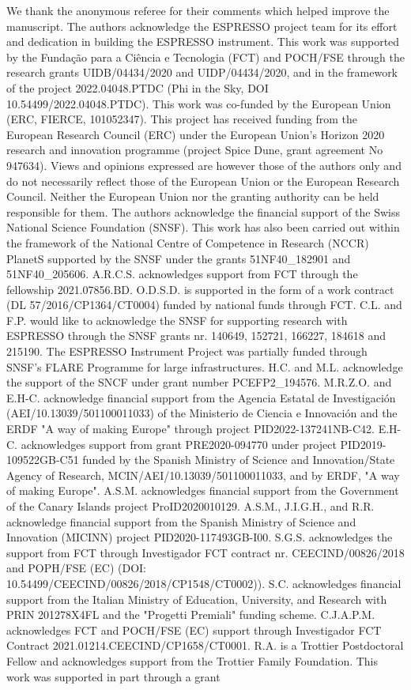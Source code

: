 \documentclass{aa}
\begin{document}
\begin{acknowledgements}
We thank the anonymous referee for their comments which helped improve the manuscript. The authors acknowledge the ESPRESSO project team for its effort and dedication in building the ESPRESSO instrument. This work was supported by the Funda\c{c}\~ao para a Ci\^encia e Tecnologia (FCT) and POCH/FSE through the research grants UIDB/04434/2020 and UIDP/04434/2020, and in the framework of the project 2022.04048.PTDC (Phi in the Sky, DOI 10.54499/2022.04048.PTDC). This work was co-funded by the European Union (ERC, FIERCE, 101052347). This project has received funding from the European Research Council (ERC) under the European Union's Horizon 2020 research and innovation programme (project {\sc Spice Dune}, grant agreement No 947634). Views and opinions expressed are however those of the authors only and do not necessarily reflect those of the European Union or the European Research Council. Neither the European Union nor the granting authority can be held responsible for them. The authors acknowledge the financial support of the Swiss National Science Foundation (SNSF). This work has also been carried out within the framework of the National Centre of Competence in Research (NCCR) PlanetS supported by the SNSF under the grants 51NF40\_182901 and 51NF40\_205606. A.R.C.S. acknowledges support from FCT through the fellowship 2021.07856.BD. O.D.S.D. is supported in the form of a work contract (DL 57/2016/CP1364/CT0004) funded by national funds through FCT. C.L. and F.P. would like to acknowledge the SNSF for supporting research with ESPRESSO through the SNSF grants nr. 140649, 152721, 166227, 184618 and 215190. The ESPRESSO Instrument Project was partially funded through SNSF’s FLARE Programme for large infrastructures. H.C. and M.L. acknowledge the support of the SNCF under grant number PCEFP2\_194576. M.R.Z.O. and E.H-C. acknowledge financial support from the Agencia Estatal de Investigaci\'on (AEI/10.13039/501100011033) of the Ministerio de Ciencia e Innovaci\'on and the ERDF "A way of making Europe" through project PID2022-137241NB-C42. E.H-C. acknowledges support from grant PRE2020-094770 under project PID2019-109522GB-C51 funded by the Spanish Ministry of Science and Innovation/State Agency of Research, MCIN/AEI/10.13039/501100011033, and by ERDF, "A way of making Europe". A.S.M. acknowledges financial support from the Government of the Canary Islands project ProID2020010129. A.S.M., J.I.G.H., and R.R. acknowledge financial support from the Spanish Ministry of Science and Innovation (MICINN) project PID2020-117493GB-I00. S.G.S. acknowledges the support from FCT through Investigador FCT contract nr. CEECIND/00826/2018 and POPH/FSE (EC) (DOI: 10.54499/CEECIND/00826/2018/CP1548/CT0002)). S.C. acknowledges financial support from the Italian Ministry of Education, University, and Research with PRIN 201278X4FL and the "Progetti Premiali" funding scheme. C.J.A.P.M. acknowledges FCT and POCH/FSE (EC) support through Investigador FCT Contract 2021.01214.CEECIND/CP1658/CT0001. R.A. is a Trottier Postdoctoral Fellow and acknowledges support from the Trottier Family Foundation. This work was supported in part through a grant 
\end{acknowledgements}
\end{document}
